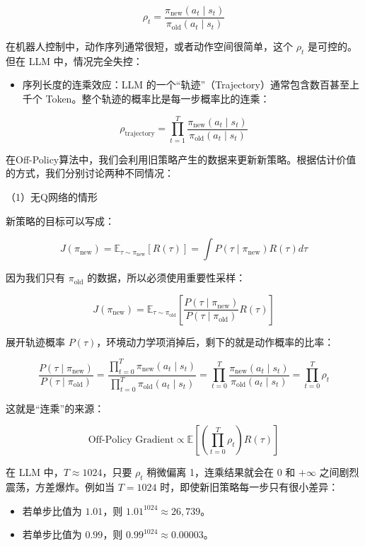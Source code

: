 \[
\rho_t
=
\frac{\pi_{\mathrm{new}}(a_t \mid s_t)}
{\pi_{\mathrm{old}}(a_t \mid s_t)}
\]

在机器人控制中，动作序列通常很短，或者动作空间很简单，这个 \(\rho_t\) 是可控的。但在 LLM 中，情况完全失控：

\begin{itemize}
\tightlist
\item
  序列长度的连乘效应：LLM 的一个``轨迹''（Trajectory）通常包含数百甚至上千个 Token。整个轨迹的概率比是每一步概率比的连乘：
\end{itemize}

\[
\rho_{\mathrm{trajectory}}
=
\prod_{t=1}^{T}
\frac{\pi_{\mathrm{new}}(a_t\mid s_t)}
{\pi_{\mathrm{old}}(a_t\mid s_t)}
\]

在Off-Policy算法中，我们会利用旧策略产生的数据来更新新策略。根据估计价值的方式，我们分别讨论两种不同情况：

（1）无Q网络的情形

新策略的目标可以写成：

\[
J(\pi_{\mathrm{new}})
=
\mathbb{E}_{\tau\sim\pi_{\mathrm{new}}}[R(\tau)]
=
\int P(\tau\mid\pi_{\mathrm{new}})R(\tau)d\tau
\]

因为我们只有 \(\pi_{\mathrm{old}}\) 的数据，所以必须使用重要性采样：

\[
J(\pi_{\mathrm{new}})
=
\mathbb{E}_{\tau\sim\pi_{\mathrm{old}}}
\left[
\frac{P(\tau\mid\pi_{\mathrm{new}})}
{P(\tau\mid\pi_{\mathrm{old}})}
R(\tau)
\right]
\]

展开轨迹概率 \(P(\tau)\)，环境动力学项消掉后，剩下的就是动作概率的比率：

\[
\frac{P(\tau\mid\pi_{\mathrm{new}})}
{P(\tau\mid\pi_{\mathrm{old}})}
=
\frac{\prod_{t=0}^{T}\pi_{\mathrm{new}}(a_t\mid s_t)}
{\prod_{t=0}^{T}\pi_{\mathrm{old}}(a_t\mid s_t)}
=
\prod_{t=0}^{T}
\frac{\pi_{\mathrm{new}}(a_t\mid s_t)}
{\pi_{\mathrm{old}}(a_t\mid s_t)}
=
\prod_{t=0}^{T}\rho_t
\]

这就是``连乘''的来源：

\[
\text{Off-Policy Gradient}
\propto
\mathbb{E}
\left[
\left(\prod_{t=0}^{T}\rho_t\right)R(\tau)
\right]
\]

在 LLM 中，\(T\approx1024\)，只要 \(\rho_t\) 稍微偏离 1，连乘结果就会在 0 和 \(+\infty\) 之间剧烈震荡，方差爆炸。例如当 \(T=1024\) 时，即使新旧策略每一步只有很小差异：

\begin{itemize}
\tightlist
\item
  若单步比值为 \(1.01\)，则 \(1.01^{1024}\approx 26,739\)。
\item
  若单步比值为 \(0.99\)，则 \(0.99^{1024}\approx 0.00003\)。
\end{itemize}

